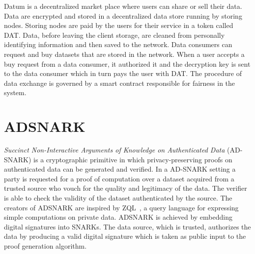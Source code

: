Datum is a decentralized market place where users can share or sell their data. Data are encrypted and stored in a decentralized data store running by storing nodes. Storing nodes are paid by the users for their service in a token called DAT. Data, before leaving the client storage, are cleaned from personally identifying information and then saved to the network. Data consumers can request and buy datasets that are stored in the network. When a user accepts a buy request from a data consumer, it authorized it and the decryption key is sent to the data consumer which in turn pays the user with DAT. The procedure of data exchange is governed by a smart contract responsible for fairness in the system.

\section{ADSNARK}
\label{rel_work:adsnark}

\textit{Succinct Non-Interactive Arguments of Knowledge on Authenticated Data} (AD-SNARK) is a cryptographic primitive in which privacy-preserving proofs on authenticated data can be generated and verified. In a AD-SNARK setting a party is requested for a proof of computation over a dataset acquired from a trusted source who vouch for the quality and legitimacy of the data. The verifier is able to check the validity of the dataset authenticated by the source. The creators of ADSNARK are inspired by ZQL~\cite{zql}, a query language for expressing simple computations on private data. ADSNARK is achieved by embedding digital signatures into SNARKs. The data source, which is trusted, authorizes the data by producing a valid digital signature which is taken as public input to the proof generation algorithm.
